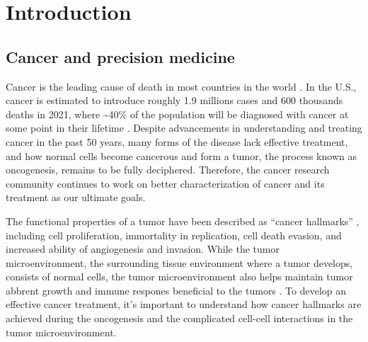 \chapter{Introduction}
\label{chap:intro}
\tightlists











\section{Cancer and precision medicine}
Cancer is the leading cause of death in most countries in the world \cite{sungh_brayf:GlobalCancer2021}. In the U.S., cancer is estimated to introduce roughly 1.9 millions cases and 600 thousands deaths in 2021, where \textasciitilde40\% of the population will be diagnosed with cancer at some point in their lifetime \cite{siegelrl_jemala:CancerStatistics2021}. Despite advancements in understanding and treating cancer in the past 50 years, many forms of the disease lack effective treatment, and how normal cells become cancerous and form a tumor, the process known as oncogenesis, remains to be fully deciphered. Therefore, the cancer research community continues to work on better characterization of cancer and its treatment as our ultimate goals.

The functional properties of a tumor have been described as ``cancer hallmarks'' \cite{hanahand_weinbergra:HallmarksCancer2011}, including cell proliferation, immortality in replication, cell death evasion, and increased ability of angiogenesis and invasion. While the tumor microenvironment, the surrounding tissue environment where a tumor develops, consists of normal cells, the tumor microenvironment also helps maintain tumor abbrent growth and immune respones beneficial to the tumors \cite{hanahand_weinbergra:HallmarksCancer2011,quaildf_joyceja:MicroenvironmentalRegulation2013}. To develop an effective cancer treatment, it's important to understand how cancer hallmarks are achieved during the oncogenesis and the complicated cell-cell interactions in the tumor microenvironment.


